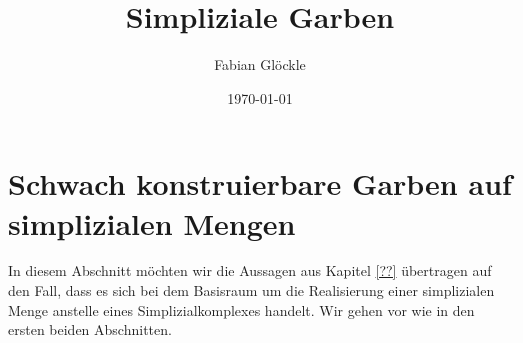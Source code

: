 



\title{Simpliziale Garben}
\author{Fabian Glöckle}
\date{\today}

\section{Schwach konstruierbare Garben auf simplizialen Mengen}

In diesem Abschnitt möchten wir die Aussagen aus Kapitel \ref{??}
übertragen auf den Fall, dass es sich bei dem Basisraum um die
Realisierung einer simplizialen Menge anstelle eines
Simplizialkomplexes handelt. Wir gehen vor wie in den ersten beiden
Abschnitten.

